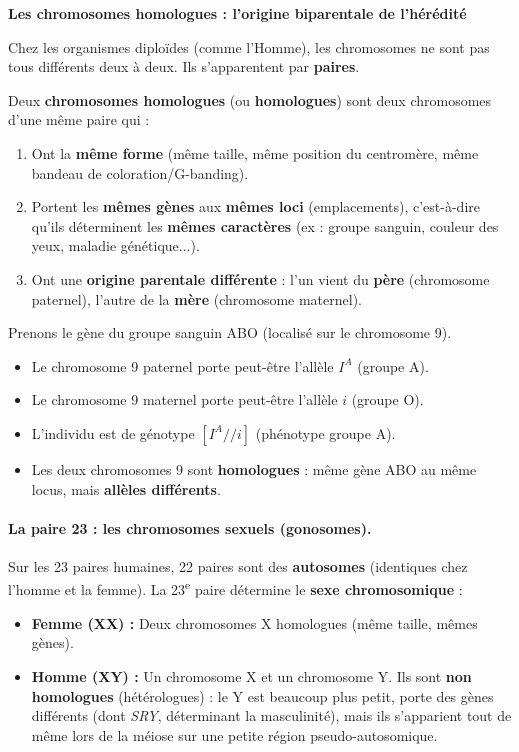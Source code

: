 \documentclass[11pt]{article}
\begin{document}
\textbf{Les chromosomes homologues : l'origine biparentale de l'hérédité}\par

Chez les organismes diploïdes (comme l'Homme), les chromosomes ne sont pas tous différents deux à deux. Ils s'apparentent par \textbf{paires}.

\begin{definition}
Deux \textbf{chromosomes homologues} (ou \textbf{homologues}) sont deux chromosomes d'une même paire qui :
\begin{enumerate}
    \item Ont la \textbf{même forme} (même taille, même position du centromère, même bandeau de coloration/G-banding).
    \item Portent les \textbf{mêmes gènes} aux \textbf{mêmes loci} (emplacements), c'est-à-dire qu'ils déterminent les \textbf{mêmes caractères} (ex : groupe sanguin, couleur des yeux, maladie génétique...).
    \item Ont une \textbf{origine parentale différente} : l'un vient du \textbf{père} (chromosome paternel), l'autre de la \textbf{mère} (chromosome maternel).
\end{enumerate}
\end{definition}

\begin{exemplebox}
Prenons le gène du groupe sanguin ABO (localisé sur le chromosome 9).
\begin{itemize}
    \item Le chromosome 9 paternel porte peut-être l'allèle $I^A$ (groupe A).
    \item Le chromosome 9 maternel porte peut-être l'allèle $i$ (groupe O).
    \item L'individu est de génotype $[I^A // i]$ (phénotype groupe A).
    \item Les deux chromosomes 9 sont \textbf{homologues} : même gène ABO au même locus, mais \textbf{allèles différents}.
\end{itemize}
\end{exemplebox}

\paragraph{La paire 23 : les chromosomes sexuels (gonosomes).}
Sur les 23 paires humaines, 22 paires sont des \textbf{autosomes} (identiques chez l'homme et la femme). La 23\textsuperscript{e} paire détermine le \textbf{sexe chromosomique} :
\begin{itemize}
    \item \textbf{Femme (XX) :} Deux chromosomes X homologues (même taille, mêmes gènes).
    \item \textbf{Homme (XY) :} Un chromosome X et un chromosome Y. Ils sont \textbf{non homologues} (hétérologues) : le Y est beaucoup plus petit, porte des gènes différents (dont \emph{SRY}, déterminant la masculinité), mais ils s'apparient tout de même lors de la méiose sur une petite région pseudo-autosomique.
\end{itemize}
\end{document}
